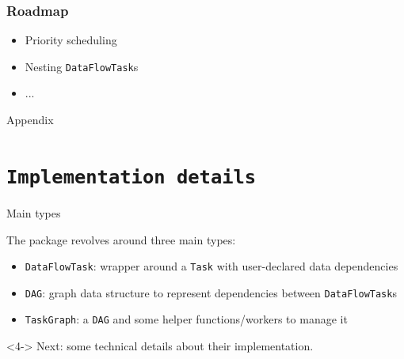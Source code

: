 \documentclass{beamer}
\newcommand{\DFT}{\texttt{DataFlowTasks.jl}}
\begin{document}

\begin{frame}
\frametitle{Roadmap}  

\begin{itemize}
  \item Priority scheduling
  \item Nesting \texttt{DataFlowTask}s
  \item ...
\end{itemize} 
\end{frame}

\appendix

\begin{frame}
  \begin{center}
    \Huge Appendix
  \end{center}
\end{frame}

\section{\texttt{Implementation details}}

\begin{frame}{Main types}

The package revolves around three main types:
\begin{itemize}
  \item <1->\texttt{DataFlowTask}: wrapper around a
  \texttt{Task} with user-declared data dependencies
  \item <2->\texttt{DAG}: graph data
  structure to represent dependencies between \texttt{DataFlowTask}s
  \item <3->\texttt{TaskGraph}: a
  \texttt{DAG} and some helper functions/workers to manage it

\end{itemize}

\begin{alertblock}<4->{}
  Next: some technical details about their
  implementation.
\end{alertblock}

\end{frame}
\end{document}
